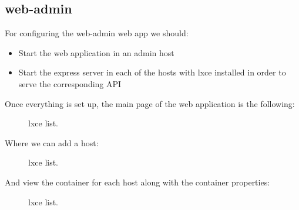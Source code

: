 
\subsection{web-admin}
For configuring the web-admin web app we should:
\begin{itemize}
	\item{Start the web application in an admin host}
	\item{Start the express server in each of the hosts with lxce installed in order to serve the corresponding API}
\end{itemize}

Once everything is set up, the main page of the web application is the following:
\begin{figure}[H]
\label{fig:web-admin}
\centering
{}
\caption[Prototype setup]{\footnotesize{lxce list.}}
\end{figure}

Where we can add a host:
\begin{figure}[H]
\label{fig:lxce list}
\centering
{}
\caption[Prototype setup]{\footnotesize{lxce list.}}
\end{figure}

\newpage
And view the container for each host along with the container properties:
\begin{figure}[H]
\label{fig:lxce list}
\centering
{}
\caption[Prototype setup]{\footnotesize{lxce list.}}
\end{figure}


